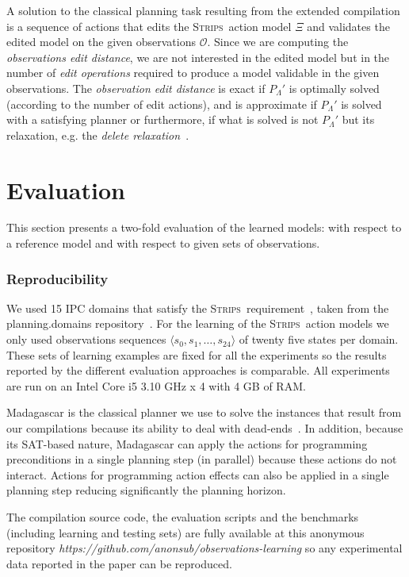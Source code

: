\documentclass{article}
\newcommand{\tup}[1]{{\langle #1 \rangle}}
\newcommand{\strips}{\textsc{Strips}}     %
\begin{document}
A solution to the classical planning task resulting from the extended compilation is a sequence of actions that edits the \strips\ action model $\Xi$ and validates the edited model on the given observations $\mathcal{O}$. Since we are computing the {\em observations edit distance}, we are not interested in the edited model but in the number of {\em edit operations} required to produce a model validable in the given observations. The {\em observation edit distance} is exact if $P_{\Lambda}'$ is optimally solved (according to the number of edit actions), and is approximate if $P_{\Lambda}'$ is solved with a satisfying planner or furthermore, if what is solved is not $P_{\Lambda}'$ but its relaxation, e.g. the {\em delete relaxation}~\cite{bonet2001planning}.


\section{Evaluation}
This section presents a two-fold evaluation of the learned models: with respect to a reference model and with respect to given sets of observations. 

\subsubsection{Reproducibility}
We used 15 IPC domains that satisfy the \strips\ requirement~\cite{fox2003pddl2}, taken from the {\sc planning.domains} repository~\cite{muise2016planning}. For the learning of the \strips\ action models we only used observations sequences $\tup{s_0, s_1, \ldots, s_{24}}$ of twenty five states per domain. These sets of learning examples are fixed for all the experiments so the results reported by the different evaluation approaches is comparable. All experiments are run on an Intel Core i5 3.10 GHz x 4 with 4 GB of RAM.

{\sc Madagascar} is the classical planner we use to solve the instances that result from our compilations because its ability to deal with dead-ends~\cite{rintanen2014madagascar}. In addition, because its SAT-based nature, {\sc Madagascar} can apply the actions for programming preconditions in a single planning step (in parallel) because these actions do not interact. Actions for programming action effects can also be applied in a single planning step reducing significantly the planning horizon.

The compilation source code, the evaluation scripts and the benchmarks (including learning and testing sets) are fully available at this anonymous repository {\em https://github.com/anonsub/observations-learning} so any experimental data reported in the paper can be reproduced.
\end{document}
